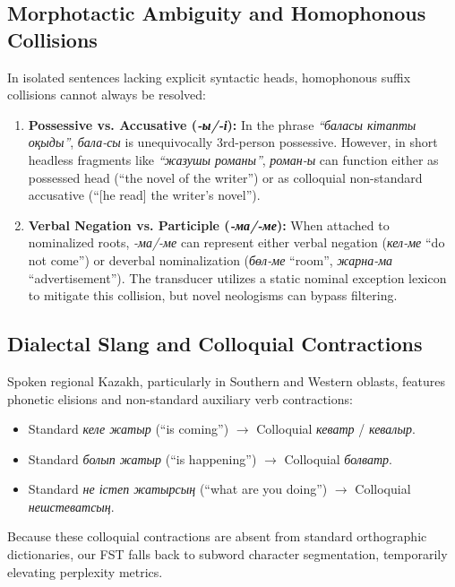 \subsection{Morphotactic Ambiguity and Homophonous Collisions}
In isolated sentences lacking explicit syntactic heads, homophonous suffix collisions cannot always be resolved:
\begin{enumerate}
    \item \textbf{Possessive vs. Accusative (\textit{-ы/-і}):} In the phrase \textit{``баласы кітапты оқыды''}, \textit{бала-сы} is unequivocally 3rd-person possessive. However, in short headless fragments like \textit{``жазушы романы''}, \textit{роман-ы} can function either as possessed head (``the novel of the writer'') or as colloquial non-standard accusative (``[he read] the writer's novel'').
    \item \textbf{Verbal Negation vs. Participle (\textit{-ма/-ме}):} When attached to nominalized roots, \textit{-ма/-ме} can represent either verbal negation (\textit{кел-ме} ``do not come'') or deverbal nominalization (\textit{бөл-ме} ``room'', \textit{жарна-ма} ``advertisement''). The transducer utilizes a static nominal exception lexicon to mitigate this collision, but novel neologisms can bypass filtering.
\end{enumerate}

\subsection{Dialectal Slang and Colloquial Contractions}
Spoken regional Kazakh, particularly in Southern and Western oblasts, features phonetic elisions and non-standard auxiliary verb contractions:
\begin{itemize}
    \item Standard \textit{келе жатыр} (``is coming'') $\to$ Colloquial \textit{кеватр} / \textit{кевалыр}.
    \item Standard \textit{болып жатыр} (``is happening'') $\to$ Colloquial \textit{болватр}.
    \item Standard \textit{не істеп жатырсың} (``what are you doing'') $\to$ Colloquial \textit{нешстеватсың}.
\end{itemize}
Because these colloquial contractions are absent from standard orthographic dictionaries, our FST falls back to subword character segmentation, temporarily elevating perplexity metrics.

